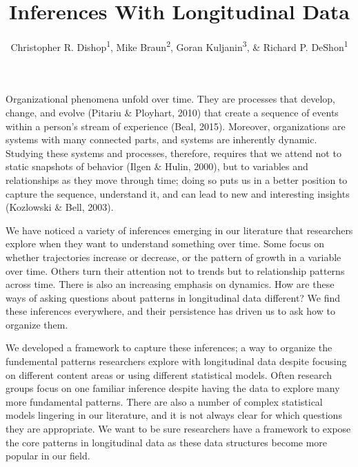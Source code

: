 \documentclass[english,,man]{apa6}
\title{Inferences With Longitudinal Data}
\author{Christopher R. Dishop\textsuperscript{1}, Mike Braun\textsuperscript{2},
Goran Kuljanin\textsuperscript{3}, \& Richard P.
DeShon\textsuperscript{1}}
\date{}
\affiliation{
\vspace{0.5cm}
\textsuperscript{1} Michigan State University\\\textsuperscript{2} University of South Florida\\\textsuperscript{3} DePaul University}
\theoremstyle{definition}
\theoremstyle{definition}
\theoremstyle{definition}
\theoremstyle{remark}
\begin{document}
\maketitle

Organizational phenomena unfold over time. They are processes that
develop, change, and evolve (Pitariu \& Ployhart, 2010) that create a
sequence of events within a person's stream of experience (Beal, 2015).
Moreover, organizations are systems with many connected parts, and
systems are inherently dynamic. Studying these systems and processes,
therefore, requires that we attend not to static snapshots of behavior
(Ilgen \& Hulin, 2000), but to variables and relationships as they move
through time; doing so puts us in a better position to capture the
sequence, understand it, and can lead to new and interesting insights
(Kozlowski \& Bell, 2003).

We have noticed a variety of inferences emerging in our literature that
researchers explore when they want to understand something over time.
Some focus on whether trajectories increase or decrease, or the pattern
of growth in a variable over time. Others turn their attention not to
trends but to relationship patterns across time. There is also an
increasing emphasis on dynamics. How are these ways of asking questions
about patterns in longitudinal data different? We find these inferences
everywhere, and their persistence has driven us to ask how to organize
them.

We developed a framework to capture these inferences; a way to organize
the fundemental patterns researchers explore with longitudinal data
despite focusing on different content areas or using different
statistical models. Often research groups focus on one familiar
inference despite having the data to explore many more fundamental
patterns. There are also a number of complex statistical models
lingering in our literature, and it is not always clear for which
questions they are appropriate. We want to be sure researchers have a
framework to expose the core patterns in longitudinal data as these data
structures become more popular in our field.
\end{document}

